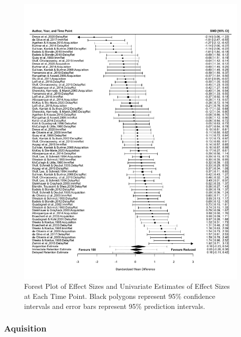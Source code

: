 \documentclass[
  english,
  man, donotrepeattitle,floatsintext]{apa7}
\begin{document}
\begin{figure}

{\centering \includegraphics[height=1.5\textheight]{../../figures/fig3} 

}

\caption{Forest Plot of Effect Sizes and Univariate Estimates of Effect Sizes at Each Time Point. Black polygons represent 95\% confidence intervals and error bars represent 95\% prediction intervals.}\label{fig:fig3}
\end{figure}

\hypertarget{aquisition}{%
\subsubsection{Aquisition}\label{aquisition}}
\end{document}
